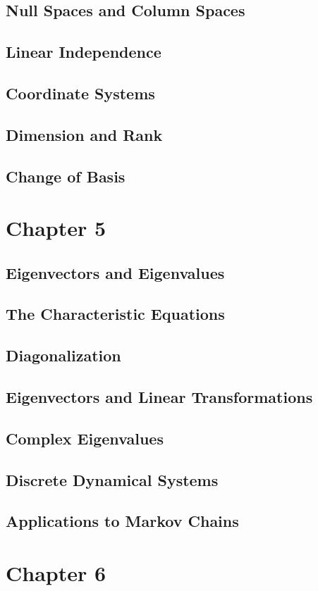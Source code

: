 \documentclass{article}
\begin{document}
\subsection{Null Spaces and Column Spaces}
\subsection{Linear Independence}
\subsection{Coordinate Systems}
\subsection{Dimension and Rank}
\subsection{Change of Basis}
\section{Chapter 5}
\subsection{Eigenvectors and Eigenvalues}
\subsection{The Characteristic Equations}
\subsection{Diagonalization}
\subsection{Eigenvectors and Linear Transformations}
\subsection{Complex Eigenvalues}
\subsection{Discrete Dynamical Systems}
\subsection{Applications to Markov Chains}
\section{Chapter 6}
\end{document}
